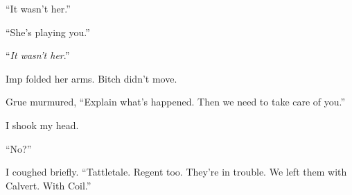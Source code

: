 ``It wasn't her.''



``She's playing you.''



``\emph{It wasn't her}.''



Imp folded her arms.  Bitch didn't move.



Grue murmured, ``Explain what's happened.  Then we need to take care of you.''



I shook my head.



``No?''



I coughed briefly.  ``Tattletale.  Regent too.  They're in trouble.  We left them with Calvert.  With Coil.''





